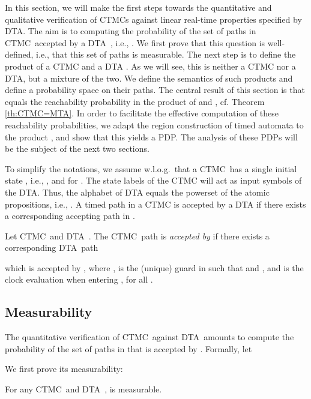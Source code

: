\documentclass{LMCS}
\newcommand{\<}{\langle}
\renewcommand{\>}{\rangle}
\newcommand{\CTMC}{\textsc{{CTMC}}}
\newcommand{\DTA}{\textsc{DTA}}
\begin{document}
In this section, we will make the first steps towards the quantitative and qualitative
verification of CTMCs against linear real-time properties specified by \DTA.
The aim is to computing the probability of the set of paths in \CTMC\ 
accepted by a \DTA\ , i.e., .
We first prove that this question is well-defined, i.e., that this set of paths is
measurable.
The next step is to define the product of a CTMC  and a DTA .
As we will see, this is neither a CTMC nor a DTA, but a mixture of the two.
We define the semantics of such products and define a probability space on their
paths.
The central result of this section is that  equals
the reachability probability in the product of  and , cf. Theorem
\ref{th:CTMC=MTA}.
In order to facilitate the effective computation of these reachability probabilities,
we adapt the region construction of timed automata to the product , and show that this yields a PDP.
The analysis of these PDPs will be the subject of the next two sections.


To simplify the notations, we assume w.l.o.g.\ that a \CTMC\ has a single initial
state , i.e., , and  for .
The state labels of the CTMC will act as input symbols of the DTA.
Thus, the alphabet of DTA equals the powerset of the atomic propositions, i.e.,
.
A timed path in a CTMC is accepted by a DTA  if there exists a corresponding
accepting path in .

\begin{defi}
Let \CTMC\  and \DTA\ .
The \CTMC\ path  is \emph{accepted
by } if there exists a corresponding \DTA\ path

which is accepted by , where ,  is the (unique) guard
in  such that  and ,
and  is the clock evaluation when entering , for all .
\end{defi}

\subsection{Measurability}
The quantitative verification of \CTMC\  against \DTA\  amounts to
compute the probability of the set of paths in  that is accepted by .
Formally, let

We first prove its measurability:

\begin{thm}\label{lem:measurability}
For any \CTMC\  and \DTA\ ,  is measurable.
\end{thm}
\end{document}
